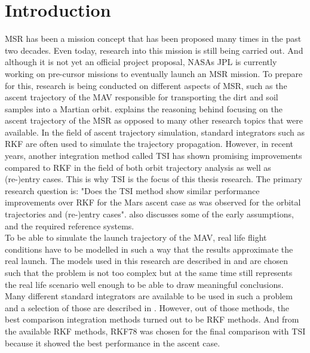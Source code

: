 \chapter{Introduction}  
\label{ch:intro}
\acf{MSR} has been a mission concept that has been proposed many times in the past two decades. Even today, research into this mission is still being carried out. And although it is not yet an official project proposal, NASAs \acf{JPL} is currently working on pre-cursor missions to eventually launch an \ac{MSR} mission. To prepare for this, research is being conducted on different aspects of \ac{MSR}, such as the ascent trajectory of the \acf{MAV} responsible for transporting the dirt and soil samples into a Martian orbit.  explains the reasoning behind focusing on the ascent trajectory of the \ac{MSR} as opposed to many other research topics that were available. In the field of ascent trajectory simulation, standard integrators such as \acf{RKF} are often used to simulate the trajectory propagation. However, in recent years, another integration method called \acf{TSI} has shown promising improvements compared to \ac{RKF} in the field of both orbit trajectory analysis as well as (re-)entry cases. This is why \ac{TSI} is the focus of this thesis research. The primary research question is: "Does the \acl{TSI} method show similar performance improvements over \acl{RKF} for the Mars ascent case as was observed for the orbital trajectories and (re-)entry cases".  also discusses some of the early assumptions, and the required reference systems.\\
To be able to simulate the launch trajectory of the \ac{MAV}, real life flight conditions have to be modelled in such a way that the results approximate the real launch. The models used in this research are described in  and are chosen such that the problem is not too complex but at the same time still represents the real life scenario well enough to be able to draw meaningful conclusions.\\
Many different standard integrators are available to be used in such a problem and a selection of those are described in . However, out of those methods, the best comparison integration methods turned out to be \ac{RKF} methods. And from the available \ac{RKF} methods, \ac{RKF78} was chosen for the final comparison with \ac{TSI} because it showed the best performance in the ascent case. \\
